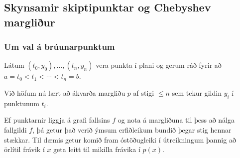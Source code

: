 \documentclass[icelandic,a4paper,12pt]{article}
\begin{document}
% 
% 
% 
% 
% 
% 

\subsection{Skynsamir skiptipunktar og Chebyshev margliður}
\subsubsection{Um val á brúunarpunktum}
Látum $(t_0,y_0),\dots,(t_n,y_n)$ vera punkta í plani og gerum ráð
fyrir að $a=t_0<t_1<\cdots<t_n=b$. 

\pause
\smallskip
Við höfum nú lært að ákvarða
margliðu $p$ af stigi $\leq n$ sem tekur gildin $y_i$ í punktunum
$t_i$.  

\pause
\smallskip
Ef punktarnir liggja á grafi fallsins $f$ og nota á margliðuna
til þess að nálga fallgildi $f$, þá getur það verið ýmsum erfiðleikum
bundið þegar stig hennar stækkar. Til dæmis getur komið fram
óstöðugleiki í útreikningum þannig að örlítil frávik í $x$ geta leitt
til mikilla frávika í $p(x)$. 
\end{document}
